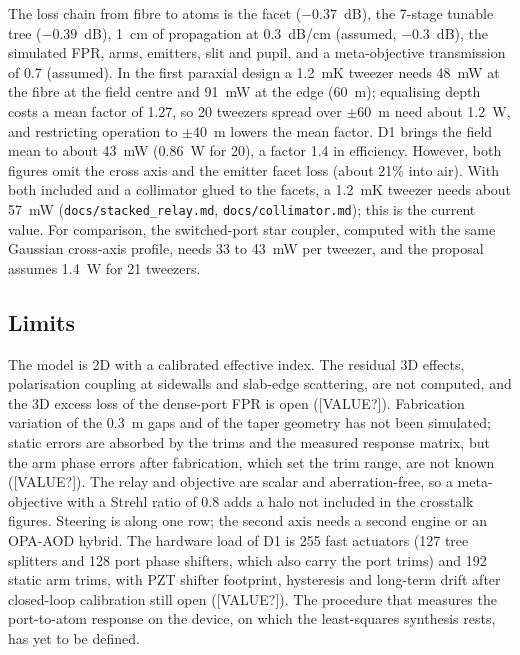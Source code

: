 The loss chain from fibre to atoms is the facet ($-0.37$~dB), the 7-stage tunable tree ($-0.39$~dB), 1~cm of propagation at 0.3~dB/cm (assumed, $-0.3$~dB), the simulated FPR, arms, emitters, slit and pupil, and a meta-objective transmission of 0.7 (assumed). In the first paraxial design a 1.2~mK tweezer needs 48~mW at the fibre at the field centre and 91~mW at the edge (60~\textmu m); equalising depth costs a mean factor of 1.27, so 20 tweezers spread over $\pm60$~\textmu m need about 1.2~W, and restricting operation to $\pm40$~\textmu m lowers the mean factor. D1 brings the field mean to about 43~mW (0.86~W for 20), a factor 1.4 in efficiency. However, both figures omit the cross axis and the emitter facet loss (about 21\% into air). With both included and a collimator glued to the facets, a 1.2~mK tweezer needs about 57~mW (\texttt{docs/stacked\_relay.md}, \texttt{docs/collimator.md}); this is the current value. For comparison, the switched-port star coupler, computed with the same Gaussian cross-axis profile, needs 33 to 43~mW per tweezer, and the proposal assumes 1.4~W for 21 tweezers.

\subsection{Limits}\label{sec:engine-limits}

The model is 2D with a calibrated effective index. The residual 3D effects, polarisation coupling at sidewalls and slab-edge scattering, are not computed, and the 3D excess loss of the dense-port FPR is open ([VALUE?]). Fabrication variation of the 0.3~\textmu m gaps and of the taper geometry has not been simulated; static errors are absorbed by the trims and the measured response matrix, but the arm phase errors after fabrication, which set the trim range, are not known ([VALUE?]). The relay and objective are scalar and aberration-free, so a meta-objective with a Strehl ratio of 0.8 adds a halo not included in the crosstalk figures. Steering is along one row; the second axis needs a second engine or an OPA-AOD hybrid. The hardware load of D1 is 255 fast actuators (127 tree splitters and 128 port phase shifters, which also carry the port trims) and 192 static arm trims, with PZT shifter footprint, hysteresis and long-term drift after closed-loop calibration still open ([VALUE?]). The procedure that measures the port-to-atom response on the device, on which the least-squares synthesis rests, has yet to be defined.
